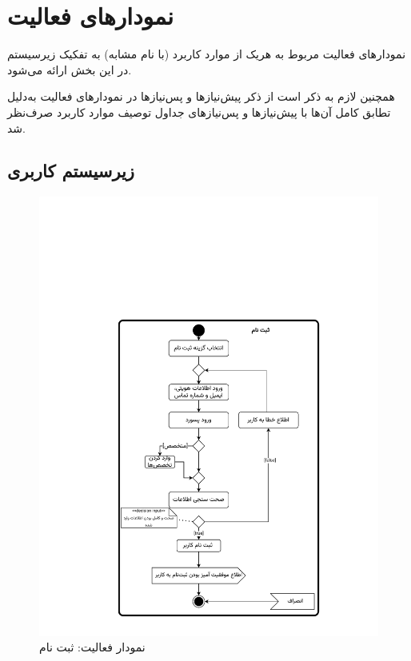 \chapter{نمودارهای فعالیت}

نمودارهای فعالیت مربوط به هریک از موارد کاربرد (با نام مشابه) به تفکیک زیرسیستم در این بخش ارائه می‌شود.

همچنین لازم به ذکر است از ذکر پیش‌نیازها و پس‌نیازها در نمودارهای فعالیت به‌دلیل تطابق کامل آن‌ها با پیش‌نیاز‌ها و پس‌نیازهای جداول توصیف موارد کاربرد صرف‌نظر شد.
\newpage
\section{زیرسیستم کاربری}

\begin{figure}[ht!]
	\centering
	\includegraphics[scale=0.6, page=1]{figs/OOD-activity1-10.pdf}
	\caption{نمودار فعالیت: ثبت نام}
\end{figure}
\FloatBarrier
\newpage

